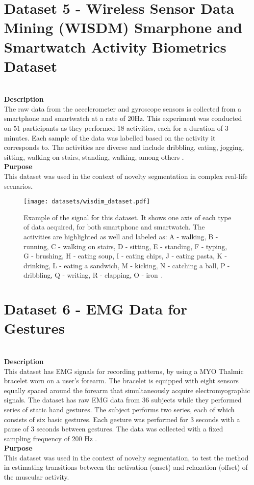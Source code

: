 \section{Dataset 5 - Wireless Sensor Data Mining (WISDM) Smarphone and Smartwatch Activity Biometrics Dataset}\\
\textbf{Description}\\
The raw data from the accelerometer and gyroscope sensors is collected from a smartphone and smartwatch at a rate of 20Hz. This experiment was conducted on 51 participants as they performed 18 activities, each for a duration of 3 minutes. Each sample of the data was labelled based on the activity it corresponds to. The activities are diverse and include dribbling, eating, jogging, sitting, walking on stairs, standing, walking, among others \cite{dataset4}.\\
\textbf{Purpose}\\
This dataset was used in the context of novelty segmentation in complex real-life scenarios.

\begin{figure}
\centering
\texttt{[image: datasets/wisdim\_dataset.pdf]}
\caption{Example of the signal for this dataset. It shows one axis of each type of data acquired, for both smartphone and smartwatch. The activities are highlighted as well and labeled as: A - walking, B - running, C - walking on stairs, D - sitting, E - standing, F -   typing, G - brushing, H - eating soup, I - eating chips, J - eating pasta, K - drinking, L - eating a sandwich, M - kicking, N - catching a ball, P - dribbling, Q - writing, R - clapping, O - iron \cite{dataset4}.}
\label{fig:wisdim_data}
\end{figure}

\section{Dataset 6 - EMG Data for Gestures}\\
\textbf{Description}\\
This dataset has EMG signals for recording patterns, by using a MYO Thalmic bracelet worn on a user's forearm. The bracelet is equipped with eight sensors equally spaced around the forearm that simultaneously acquire electromyographic signals. The dataset has raw EMG data from 36 subjects while they performed series of static hand gestures. The subject performs two series, each of which consists of six basic gestures. Each gesture was performed for 3 seconds with a pause of 3 seconds between gestures. The data was collected with a fixed sampling frequency of 200 Hz \cite{dataset5}.\\
\textbf{Purpose}\\
This dataset was used in the context of novelty segmentation, to test the method in estimating transitions between the activation (onset) and relaxation (offset) of the muscular activity.

